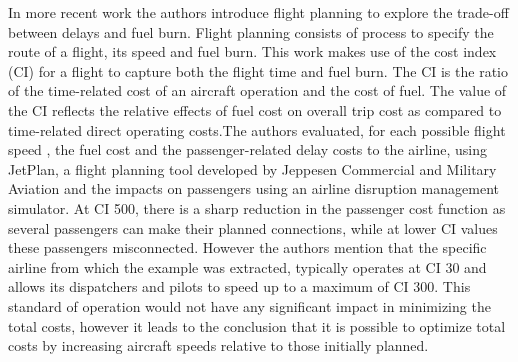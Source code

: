 In more recent work \citep{Marla2017} the authors introduce flight planning to explore the trade-off between delays and fuel burn. Flight planning consists of process to specify the route of a flight, its speed and fuel burn. This work makes use of the cost index (CI) for a flight to capture both the flight time and fuel burn.  The CI is the ratio of the time-related cost of an aircraft operation and the cost of fuel. The value of the CI reflects the relative effects of fuel cost on overall trip cost as compared to time-related direct operating costs.The authors evaluated, for each possible flight speed , the fuel cost and the passenger-related delay costs to the airline, using JetPlan, a flight planning tool developed by Jeppesen Commercial and Military Aviation and the impacts on passengers using an airline disruption management simulator. At CI 500, there is a sharp reduction in the passenger cost function as several passengers can make their planned connections, while at lower CI values these passengers misconnected. However the authors mention that the specific airline  from which the example was extracted, typically operates at CI 30 and allows its dispatchers and pilots to speed up to a maximum of CI 300. This standard of operation would not have any significant impact in minimizing the total costs, however it leads to the conclusion that it is possible to optimize total costs by increasing aircraft speeds relative to those initially planned.\\

